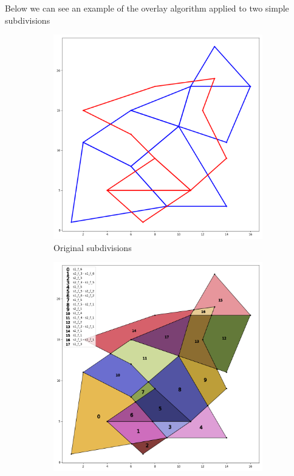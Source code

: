 Below we can see an example of the overlay algorithm applied to two simple subdivisions
\begin{figure}[H]
    \begin{subfigure}{0.5\textwidth}
        \includegraphics[width=\linewidth]{images/test_1_test_2_dcels.png}
        \caption{Original subdivisions}
        \label{fig:overlay_subdivisions}
    \end{subfigure}
    \begin{subfigure}{0.5\textwidth}
        \includegraphics[width=\linewidth]{images/test_1_test_2.png}

\end{subfigure}
\end{figure}
